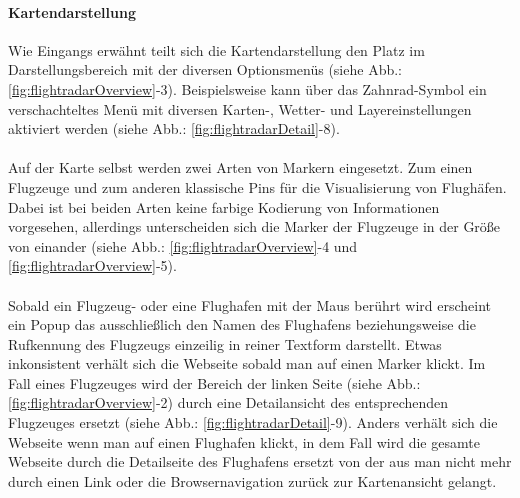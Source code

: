 \documentclass[../Bachelorarbeit.tex]{subfiles}
\begin{document}
\paragraph{Kartendarstellung}
\label{flightradarMap}
Wie Eingangs erwähnt teilt sich die Kartendarstellung den Platz im Darstellungsbereich mit der diversen Optionsmenüs (siehe Abb.: \ref{fig:flightradarOverview}-3). 
Beispielsweise kann über das Zahnrad-Symbol ein verschachteltes Menü mit diversen Karten-, Wetter- und Layereinstellungen aktiviert werden (siehe Abb.: \ref{fig:flightradarDetail}-8).\\
\\
Auf der Karte selbst werden zwei Arten von Markern eingesetzt. 
Zum einen Flugzeuge und zum anderen klassische Pins für die Visualisierung von Flughäfen.
Dabei ist bei beiden Arten keine farbige Kodierung von Informationen vorgesehen, allerdings unterscheiden sich die Marker der Flugzeuge in der Größe von einander (siehe Abb.: \ref{fig:flightradarOverview}-4 und \ref{fig:flightradarOverview}-5).\\
\\
Sobald ein Flugzeug- oder eine Flughafen mit der Maus berührt wird erscheint ein Popup das ausschließlich den Namen des Flughafens beziehungsweise die Rufkennung des Flugzeugs einzeilig in reiner Textform darstellt.
Etwas inkonsistent verhält sich die Webseite sobald man auf einen Marker klickt.
Im Fall eines Flugzeuges wird der Bereich der linken Seite (siehe Abb.: \ref{fig:flightradarOverview}-2) durch eine Detailansicht des entsprechenden Flugzeuges ersetzt (siehe Abb.: \ref{fig:flightradarDetail}-9).
Anders verhält sich die Webseite wenn man auf einen Flughafen klickt, in dem Fall wird die gesamte Webseite durch die Detailseite des Flughafens ersetzt von der aus man nicht mehr durch einen Link oder die Browsernavigation zurück zur Kartenansicht gelangt.
\end{document}
